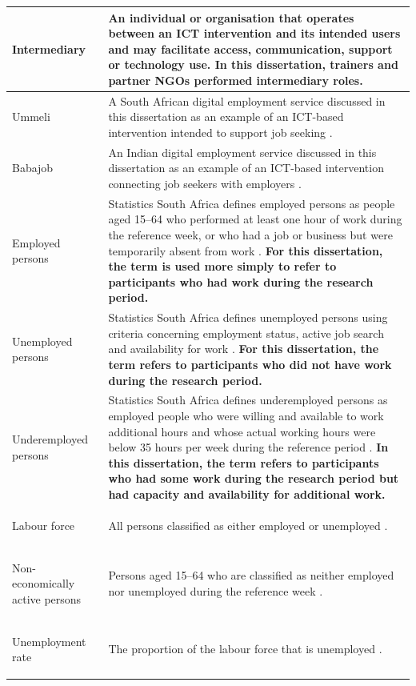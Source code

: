\begin{longtable}{
    >{\bfseries\raggedright\arraybackslash}p{}
    >{\raggedright\arraybackslash}p{}
}
Intermediary &
An individual or organisation that operates between an ICT intervention and its intended users and may facilitate access, communication, support or technology use. In this dissertation, trainers and partner NGOs performed intermediary roles. \\
\hline

Ummeli &
A South African digital employment service discussed in this dissertation as an example of an ICT-based intervention intended to support job seeking \cite{gitau2012}. \\
\hline

Babajob &
An Indian digital employment service discussed in this dissertation as an example of an ICT-based intervention connecting job seekers with employers \cite{babajob2016}. \\
\hline

Employed persons &
Statistics South Africa defines employed persons as people aged 15--64 who performed at least one hour of work during the reference week, or who had a job or business but were temporarily absent from work \cite{statssa2016}. \textbf{For this dissertation, the term is used more simply to refer to participants who had work during the research period.} \\
\hline

Unemployed persons &
Statistics South Africa defines unemployed persons using criteria concerning employment status, active job search and availability for work \cite{statssa2016}. \textbf{For this dissertation, the term refers to participants who did not have work during the research period.} \\
\hline

Underemployed persons &
Statistics South Africa defines underemployed persons as employed people who were willing and available to work additional hours and whose actual working hours were below 35 hours per week during the reference period \cite{statssa2016}. \textbf{In this dissertation, the term refers to participants who had some work during the research period but had capacity and availability for additional work.} \\
\hline

Labour force &
All persons classified as either employed or unemployed \cite{statssa2016}. \\
\hline

Non-economically active persons &
Persons aged 15--64 who are classified as neither employed nor unemployed during the reference week \cite{statssa2016}. \\
\hline

Unemployment rate &
The proportion of the labour force that is unemployed \cite{statssa2016}. \\

\end{longtable}